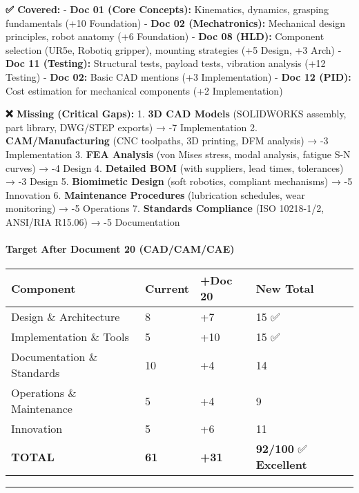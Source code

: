 \documentclass[
]{article}
\begin{document}
\textbf{✅ Covered:} - \textbf{Doc 01 (Core Concepts):} Kinematics,
dynamics, grasping fundamentals (+10 Foundation) - \textbf{Doc 02
(Mechatronics):} Mechanical design principles, robot anatomy (+6
Foundation) - \textbf{Doc 08 (HLD):} Component selection (UR5e, Robotiq
gripper), mounting strategies (+5 Design, +3 Arch) - \textbf{Doc 11
(Testing):} Structural tests, payload tests, vibration analysis (+12
Testing) - \textbf{Doc 02:} Basic CAD mentions (+3 Implementation) -
\textbf{Doc 12 (PID):} Cost estimation for mechanical components (+2
Implementation)

\textbf{❌ Missing (Critical Gaps):} 1. \textbf{3D CAD Models}
(SOLIDWORKS assembly, part library, DWG/STEP exports) → -7
Implementation 2. \textbf{CAM/Manufacturing} (CNC toolpaths, 3D
printing, DFM analysis) → -3 Implementation 3. \textbf{FEA Analysis}
(von Mises stress, modal analysis, fatigue S-N curves) → -4 Design 4.
\textbf{Detailed BOM} (with suppliers, lead times, tolerances) → -3
Design 5. \textbf{Biomimetic Design} (soft robotics, compliant
mechanisms) → -5 Innovation 6. \textbf{Maintenance Procedures}
(lubrication schedules, wear monitoring) → -5 Operations 7.
\textbf{Standards Compliance} (ISO 10218-1/2, ANSI/RIA R15.06) → -5
Documentation

\hypertarget{target-after-document-20-cadcamcae}{%
\paragraph{Target After Document 20
(CAD/CAM/CAE)}\label{target-after-document-20-cadcamcae}}

\begin{longtable}[]{@{}llll@{}}
\toprule\noalign{}
Component & Current & +Doc 20 & New Total \\
\midrule\noalign{}
\endhead
\bottomrule\noalign{}
\endlastfoot
Design \& Architecture & 8 & +7 & 15 ✅ \\
Implementation \& Tools & 5 & +10 & 15 ✅ \\
Documentation \& Standards & 10 & +4 & 14 \\
Operations \& Maintenance & 5 & +4 & 9 \\
Innovation & 5 & +6 & 11 \\
\textbf{TOTAL} & \textbf{61} & \textbf{+31} & \textbf{92/100} ✅
\textbf{Excellent} \\
\end{longtable}

\begin{center}\rule{0.5\linewidth}{0.5pt}\end{center}
\end{document}
